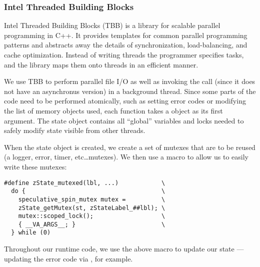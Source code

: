 
\subsubsection{Intel Threaded Building Blocks}
Intel Threaded Building Blocks\cite{reinders2007intel} (TBB) is a library for
scalable parallel
programming in C++. It provides templates for common parallel programming
patterns and abstracts away the details of synchronization, load-balancing,
and cache optimization. Instead of writing threads the programmer specifies
tasks, and the library maps them onto threads in an efficient manner.

We use TBB to perform parallel file I/O as well as invoking the
	 call (since it does not have an asynchronus version)
	in a background thread.
Since some parts of the code need to be performed atomically, such as
	setting error codes or modifying the list of memory objects used,
	each function takes a  object as its first argument.
The state object contains all ``global'' variables and locks needed to
	safely modify state visible from other threads.


When the state object is created, we create a set of mutexes that
	are to be reused (a logger, error, timer, etc\ldots mutexes).
We then use a macro to allow us to easily write these mutexes:

\begin{verbatim}
#define zState_mutexed(lbl, ...)            \
  do {                                      \
    speculative_spin_mutex mutex =          \
    zState_getMutex(st, zStateLabel_##lbl); \
    mutex::scoped_lock();                   \
    { __VA_ARGS__; }                        \
  } while (0)
\end{verbatim}


Throughout our runtime code, we use the above macro to update our state ---
 	updating the error code via ,
	for example.


